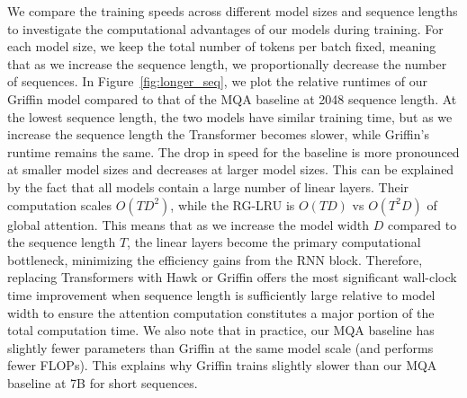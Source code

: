\documentclass[11pt, a4paper, logo, onecolumn]{googledeepmind}
\theoremstyle{definition}
\newcommand{\subblock}[0]{{block}}
\begin{document}
We compare the training speeds across different model sizes and sequence lengths to investigate the computational advantages of our models during training. 
For each model size, we keep the total number of tokens per batch fixed, meaning that as we increase the sequence length, we proportionally decrease the number of sequences. 
In Figure~\ref{fig:longer_seq}, we plot the relative runtimes of our Griffin model compared to that of the MQA baseline at 2048 sequence length. 
At the lowest sequence length, the two models have similar training time, but as we increase the sequence length the Transformer becomes slower, while Griffin's runtime remains the same. 
The drop in speed for the baseline is more pronounced at smaller model sizes and decreases at larger model sizes. 
This can be explained by the fact that all models contain a large number of linear layers.
Their computation scales $O(T D^2)$, while the RG-LRU  is $O(T D)$ vs $O(T^2 D)$ of global attention. 
This means that as we increase the model width $D$ compared to the sequence length $T$, the linear layers become the primary computational bottleneck, minimizing the efficiency gains from the RNN \subblock{}.
Therefore, replacing Transformers with Hawk or Griffin offers the most significant wall-clock time improvement when sequence length is sufficiently large relative to model width to ensure the attention computation constitutes a major portion of the total computation time. We also note that in practice, our MQA baseline has slightly fewer parameters than Griffin at the same model scale (and performs fewer FLOPs). This explains why Griffin trains slightly slower than our MQA baseline at 7B for short sequences.
\end{document}
